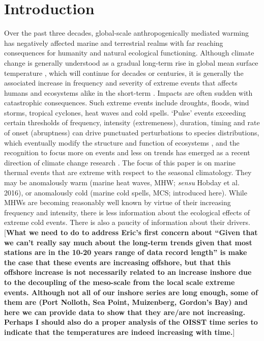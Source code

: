 \documentclass[a4paper,10pt,review]{elsarticle}
\begin{document}
\linenumbers

\section{Introduction}

Over the past three decades, global-scale anthropogenically mediated warming has negatively affected marine and terrestrial realms with far reaching consequences for humanity and natural ecological functioning. Although climate change is generally understood as a gradual long-term rise in global mean surface temperature \citep{IPCC2014}, which will continue for decades or centuries, it is generally the associated increase in frequency and severity of extreme events that affects humans and ecosystems alike in the short-term \citep{Easterling2000}. Impacts are often sudden with catastrophic consequences. Such extreme events include droughts, floods, wind storms, tropical cyclones, heat waves and cold spells. `Pulse' events exceeding certain thresholds of frequency, intensity (extremeness), duration, timing and rate of onset (abruptness) can drive punctuated perturbations to species distributions, which eventually modify the structure and function of ecosystems \citep{Wernberg2013, Rehage2016}, and the recognition to focus more on events and less on trends has emerged as a recent direction of climate change research \citep{Jentsch2007}. The focus of this paper is on marine thermal events that are extreme with respect to the seasonal climatology. They may be anomalously warm (marine heat waves, MHW; \emph{sensu} Hobday et al. 2016), or anomalously cold (marine cold spells, MCS; introduced here). While MHWs are becoming reasonably well known by virtue of their increasing frequency and intensity, there is less information about the ecological effects of extreme cold events. There is also a paucity of information about their drivers. [\textbf{What we need to do to address Eric's first concern about ``Given that we can’t really say much about the long-term trends given that most stations are in the 10-20 years range of data record length'' is make the case that these events are increasing offshore, but that this offshore increase is not necessarily related to an increase inshore due to the decoupling of the meso-scale from the local scale extreme events. Although not all of our inshore series are long enough, some of them are (Port Nolloth, Sea Point, Muizenberg, Gordon's Bay) and here we can provide data to show that they are/are not increasing. Perhaps I should also do a proper analysis of the OISST time series to indicate that the temperatures are indeed increasing with time.}]
\end{document}
